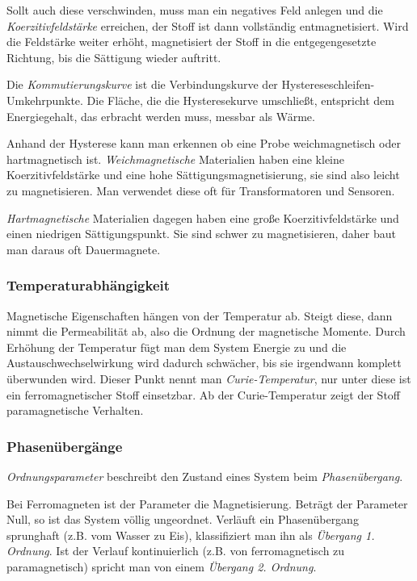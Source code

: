 \documentclass[12pt,a4paper]{scrartcl}
\numberwithin{equation}{section} %
\renewcommand{\[}{} %
\renewcommand{\]}{\noindent} %
\begin{document}
Sollt auch diese verschwinden, muss man ein negatives Feld anlegen und
die \emph{Koerzitivfeldstärke} erreichen, der Stoff ist dann vollständig
entmagnetisiert. Wird die Feldstärke weiter erhöht, magnetisiert der
Stoff in die entgegengesetzte Richtung, bis die Sättigung wieder
auftritt.

Die \emph{Kommutierungskurve} ist die Verbindungskurve der
Hystereseschleifen-Umkehrpunkte. Die Fläche, die die Hysteresekurve
umschließt, entspricht dem Energiegehalt, das erbracht werden muss,
messbar als Wärme.

Anhand der Hysterese kann man erkennen ob eine Probe weichmagnetisch
oder hartmagnetisch ist. \emph{Weichmagnetische} Materialien haben eine
kleine Koerzitivfeldstärke und eine hohe Sättigungsmagnetisierung, sie
sind also leicht zu magnetisieren. Man verwendet diese oft für
Transformatoren und Sensoren.

\emph{Hartmagnetische} Materialien dagegen haben eine große
Koerzitivfeldstärke und einen niedrigen Sättigungspunkt. Sie sind schwer
zu magnetisieren, daher baut man daraus oft Dauermagnete.

\hypertarget{temperaturabhuxe4ngigkeit}{%
\subsubsection{Temperaturabhängigkeit}\label{temperaturabhuxe4ngigkeit}}

Magnetische Eigenschaften hängen von der Temperatur ab. Steigt diese,
dann nimmt die Permeabilität ab, also die Ordnung der magnetische
Momente. Durch Erhöhung der Temperatur fügt man dem System Energie zu
und die Austauschwechselwirkung wird dadurch schwächer, bis sie
irgendwann komplett überwunden wird. Dieser Punkt nennt man
\emph{Curie-Temperatur}, nur unter diese ist ein ferromagnetischer Stoff
einsetzbar. Ab der Curie-Temperatur zeigt der Stoff paramagnetische
Verhalten.

\hypertarget{phasenuxfcberguxe4nge}{%
\subsubsection{Phasenübergänge}\label{phasenuxfcberguxe4nge}}

\emph{Ordnungsparameter} beschreibt den Zustand eines System beim
\emph{Phasenübergang}.

Bei Ferromagneten ist der Parameter die Magnetisierung. Beträgt der
Parameter Null, so ist das System völlig ungeordnet. Verläuft ein
Phasenübergang sprunghaft (z.B. vom Wasser zu Eis), klassifiziert man
ihn als \emph{Übergang 1. Ordnung}. Ist der Verlauf kontinuierlich (z.B.
von ferromagnetisch zu paramagnetisch) spricht man von einem
\emph{Übergang 2. Ordnung}.
\end{document}
